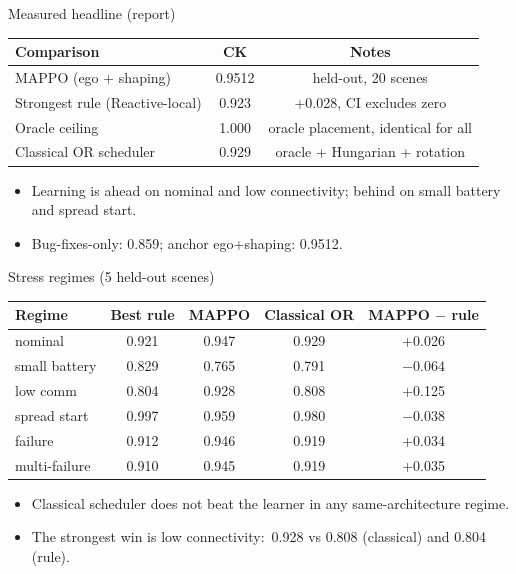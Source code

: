 \documentclass[aspectratio=169,10pt]{beamer}
\begin{document}
\begin{frame}{Measured headline (report)}
  \begin{center}
  \scriptsize
  \begin{tabular}{lcc}
    \toprule
    Comparison & CK & Notes \\
    \midrule
    MAPPO (ego + shaping) & 0.9512 & held-out, 20 scenes \\
    Strongest rule (Reactive-local) & 0.923 & +0.028, CI excludes zero \\
    Oracle ceiling & 1.000 & oracle placement, identical for all \\
    Classical OR scheduler & 0.929 & oracle + Hungarian + rotation \\
    \bottomrule
  \end{tabular}
  \end{center}
  \vspace{0.18cm}
  \begin{itemize}
    \item Learning is ahead on nominal and low connectivity; behind on small battery and spread start.
    \item Bug-fixes-only: 0.859; anchor ego+shaping: 0.9512.
  \end{itemize}
\end{frame}

\begin{frame}{Stress regimes (5 held-out scenes)}
  \begin{center}
  \small
  \begin{tabular}{lcccc}
    \toprule
    Regime & Best rule & MAPPO & Classical OR & MAPPO $-$ rule \\
    \midrule
    nominal & 0.921 & 0.947 & 0.929 & +0.026 \\
    small battery & 0.829 & 0.765 & 0.791 & $-0.064$ \\
    low comm & 0.804 & 0.928 & 0.808 & +0.125 \\
    spread start & 0.997 & 0.959 & 0.980 & $-0.038$ \\
    failure & 0.912 & 0.946 & 0.919 & +0.034 \\
    multi-failure & 0.910 & 0.945 & 0.919 & +0.035 \\
    \bottomrule
  \end{tabular}
  \end{center}
  \vspace{0.15cm}
  \begin{itemize}
    \item Classical scheduler does not beat the learner in any same-architecture regime.
    \item The strongest win is low connectivity: \,0.928 vs 0.808 (classical) and 0.804 (rule).
  \end{itemize}
\end{frame}
\end{document}
